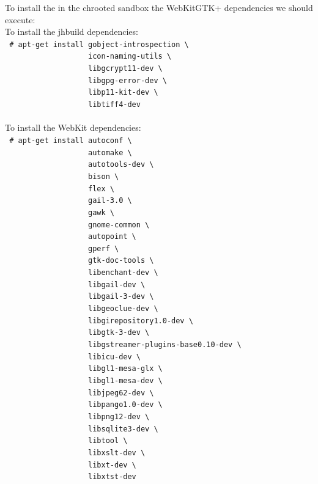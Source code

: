 \documentclass[a4paper,11pt,openany]{report}
\begin{document}
To install the in the chrooted sandbox the WebKitGTK+ dependencies we should execute:\\
To install the jhbuild dependencies:\\
\verb$ # apt-get install gobject-introspection \ $\\
\verb$                   icon-naming-utils \ $\\
\verb$                   libgcrypt11-dev \ $\\
\verb$                   libgpg-error-dev \ $\\
\verb$                   libp11-kit-dev \ $\\
\verb$                   libtiff4-dev $\\
\\
To install the WebKit dependencies:\\
\verb$ # apt-get install autoconf \ $\\
\verb$                   automake \ $\\
\verb$                   autotools-dev \ $\\
\verb$                   bison \ $\\
\verb$                   flex \ $\\
\verb$                   gail-3.0 \ $\\
\verb$                   gawk \ $\\
\verb$                   gnome-common \ $\\
\verb$                   autopoint \ $\\
\verb$                   gperf \ $\\
\verb$                   gtk-doc-tools \ $\\
\verb$                   libenchant-dev \ $\\
\verb$                   libgail-dev \ $\\
\verb$                   libgail-3-dev \ $\\
\verb$                   libgeoclue-dev \ $\\
\verb$                   libgirepository1.0-dev \ $\\
\verb$                   libgtk-3-dev \ $\\
\verb$                   libgstreamer-plugins-base0.10-dev \ $\\
\verb$                   libicu-dev \ $\\
\verb$                   libgl1-mesa-glx \ $\\
\verb$                   libgl1-mesa-dev \ $\\
\verb$                   libjpeg62-dev \ $\\
\verb$                   libpango1.0-dev \ $\\
\verb$                   libpng12-dev \ $\\
\verb$                   libsqlite3-dev \ $\\
\verb$                   libtool \ $\\
\verb$                   libxslt-dev \ $\\
\verb$                   libxt-dev \ $\\
\verb$                   libxtst-dev $\\
\end{document}
